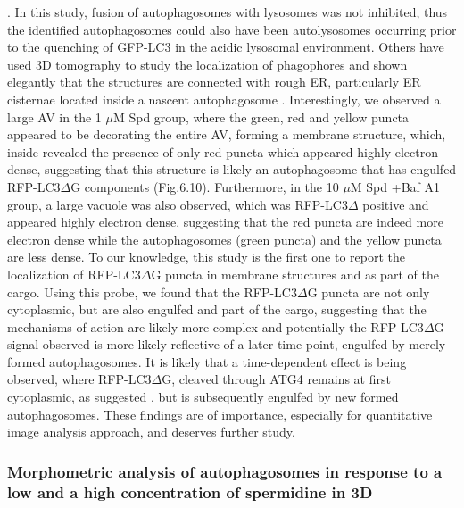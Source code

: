 \citep{Duke2014}. In this study, fusion of autophagosomes with lysosomes was not inhibited, thus the identified autophagosomes could also have been autolysosomes occurring prior to the quenching of GFP-LC3 in the acidic lysosomal environment. Others have used 3D tomography to study the localization of phagophores and shown elegantly that the structures are connected with rough ER, particularly ER cisternae located inside a nascent autophagosome \citep{Yla-Anttila2009}. Interestingly, we observed a large AV in the 1 $\mu$M Spd group, where the green, red and yellow puncta appeared to be decorating the entire AV, forming a membrane structure, which, inside revealed the presence of only red puncta which appeared highly electron dense, suggesting that this structure is likely an autophagosome that has engulfed RFP-LC3$\Delta$G components (Fig.6.10). Furthermore, in the 10 $\mu$M Spd +Baf A1 group, a large vacuole was also observed, which was RFP-LC3$\Delta$ positive and appeared highly electron dense, suggesting that the red puncta are indeed more electron dense while the autophagosomes (green puncta) and the yellow puncta are less dense. To our knowledge, this study is the first one to report the localization of RFP-LC3$\Delta$G puncta in membrane structures and as part of the cargo. Using this probe, we found that the RFP-LC3$\Delta$G puncta are not only cytoplasmic, but are also engulfed and part of the cargo, suggesting that the mechanisms of action are likely more complex and potentially the RFP-LC3$\Delta$G signal observed is more likely reflective of a later time point, engulfed by merely formed autophagosomes. It is likely that a time-dependent effect is being observed, where RFP-LC3$\Delta$G, cleaved  through ATG4 remains at first cytoplasmic, as suggested \citep{Kaizuka2016}, but is subsequently engulfed by new formed autophagosomes. These findings are of importance, especially for quantitative image analysis approach, and deserves further study.

\subsubsection{Morphometric analysis of autophagosomes  in response to a low and a high concentration of spermidine in 3D}

